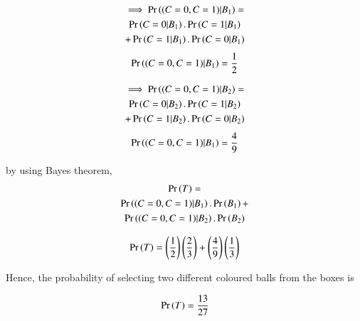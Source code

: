 \begin{multline}
    \implies\Pr\left((C=0,C=1)|B_1\right)=\\\Pr\left(C=0|B_1\right).\Pr\left(C=1|B_1\right)\\+\Pr\left(C=1|B_1\right).\Pr\left(C=0|B_1\right)
\end{multline}
\begin{align}
    \Pr\left((C=0,C=1)|B_1\right)=\frac{1}{2}
\end{align}

\begin{multline}
    \implies\Pr\left((C=0,C=1)|B_2\right)=\\\Pr\left(C=0|B_2\right).\Pr\left(C=1|B_2\right)\\+\Pr\left(C=1|B_2\right).\Pr\left(C=0|B_2\right)
\end{multline}
\begin{align}
    \Pr\left((C=0,C=1)|B_1\right)=\frac{4}{9}
\end{align}

by using Bayes theorem,
\begin{multline}
    \Pr\left(T\right)=\\
    \Pr\left((C=0,C=1)|B_1\right).\Pr\left(B_1\right)+\\
    \Pr\left((C=0,C=1)|B_2\right).\Pr\left(B_2\right)
\end{multline}

\begin{align}
    \Pr\left(T\right)=\left(\frac{1}{2}\right)\left(\frac{2}{3}\right)+\left(\frac{4}{9}\right)\left(\frac{1}{3}\right)
\end{align}

Hence, the probability of selecting two different coloured balls from the boxes is

\begin{align}
    \Pr\left(T\right)=\frac{13}{27}
\end{align}
